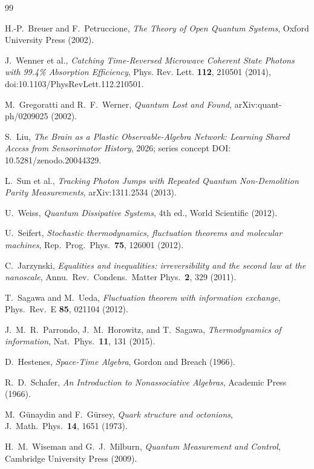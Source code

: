 \documentclass[aps,pre,onecolumn,superscriptaddress,floatfix,longbibliography]{revtex4-2}
\begin{document}
\begin{thebibliography}{99}

H.-P.~Breuer and F.~Petruccione, \emph{The Theory of Open Quantum Systems}, Oxford University Press (2002).

J.~Wenner et al., \emph{Catching Time-Reversed Microwave Coherent State
Photons with 99.4\% Absorption Efficiency}, Phys. Rev. Lett. \textbf{112},
210501 (2014), doi:10.1103/PhysRevLett.112.210501.

M.~Gregoratti and R.~F.~Werner, \emph{Quantum Lost and Found},
arXiv:quant-ph/0209025 (2002).

S.~Liu, \emph{The Brain as a Plastic Observable-Algebra Network:
Learning Shared Access from Sensorimotor History}, 2026; series concept DOI: 10.5281/zenodo.20044329.

L.~Sun et al., \emph{Tracking Photon Jumps with Repeated Quantum Non-Demolition
Parity Measurements}, arXiv:1311.2534 (2013).

U.~Weiss, \emph{Quantum Dissipative Systems}, 4th ed., World Scientific (2012).

U.~Seifert, \emph{Stochastic thermodynamics, fluctuation theorems and molecular machines}, Rep.\ Prog.\ Phys.\ \textbf{75}, 126001 (2012).

C.~Jarzynski, \emph{Equalities and inequalities: irreversibility and the second law at the nanoscale}, Annu.\ Rev.\ Condens.\ Matter Phys.\ \textbf{2}, 329 (2011).

T.~Sagawa and M.~Ueda, \emph{Fluctuation theorem with information exchange}, Phys.\ Rev.\ E \textbf{85}, 021104 (2012).

J.~M.~R.~Parrondo, J.~M.~Horowitz, and T.~Sagawa, \emph{Thermodynamics of information}, Nat.\ Phys.\ \textbf{11}, 131 (2015).

D.~Hestenes, \emph{Space-Time Algebra}, Gordon and Breach (1966).

R.~D.~Schafer, \emph{An Introduction to Nonassociative Algebras}, Academic Press (1966).

M.~G\"unaydin and F.~G\"ursey, \emph{Quark structure and octonions}, J.\ Math.\ Phys.\ \textbf{14}, 1651 (1973).

H.~M.~Wiseman and G.~J.~Milburn, \emph{Quantum Measurement and Control}, Cambridge University Press (2009).


\end{thebibliography}
\end{document}

